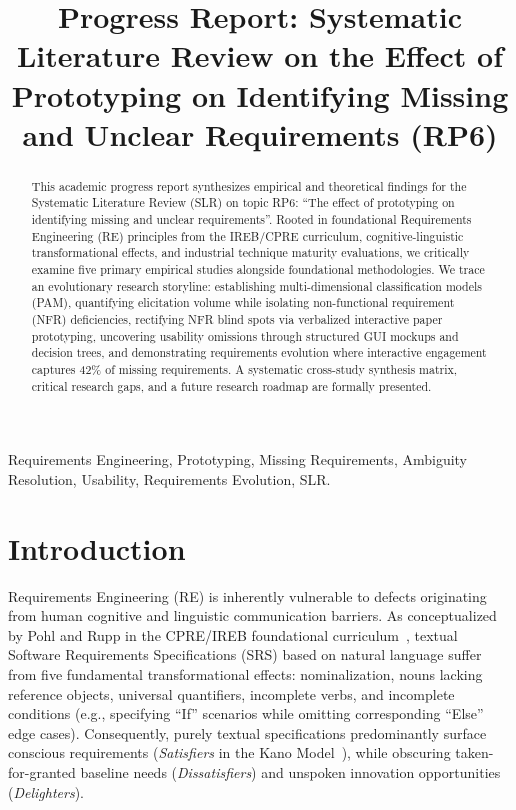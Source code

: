 \documentclass[conference]{IEEEtran}
\begin{document}
\title{Progress Report: Systematic Literature Review on the Effect of Prototyping on Identifying Missing and Unclear Requirements (RP6)}

\author{
}

\maketitle

\begin{abstract}
This academic progress report synthesizes empirical and theoretical findings for the Systematic Literature Review (SLR) on topic RP6: ``The effect of prototyping on identifying missing and unclear requirements''. Rooted in foundational Requirements Engineering (RE) principles from the IREB/CPRE curriculum, cognitive-linguistic transformational effects, and industrial technique maturity evaluations, we critically examine five primary empirical studies alongside foundational methodologies. We trace an evolutionary research storyline: establishing multi-dimensional classification models (PAM), quantifying elicitation volume while isolating non-functional requirement (NFR) deficiencies, rectifying NFR blind spots via verbalized interactive paper prototyping, uncovering usability omissions through structured GUI mockups and decision trees, and demonstrating requirements evolution where interactive engagement captures 42\% of missing requirements. A systematic cross-study synthesis matrix, critical research gaps, and a future research roadmap are formally presented.
\end{abstract}

\begin{IEEEkeywords}
Requirements Engineering, Prototyping, Missing Requirements, Ambiguity Resolution, Usability, Requirements Evolution, SLR.
\end{IEEEkeywords}

\section{Introduction}
Requirements Engineering (RE) is inherently vulnerable to defects originating from human cognitive and linguistic communication barriers. As conceptualized by Pohl and Rupp in the CPRE/IREB foundational curriculum~\cite{bbau_re_book, PohlRupp2015}, textual Software Requirements Specifications (SRS) based on natural language suffer from five fundamental transformational effects: nominalization, nouns lacking reference objects, universal quantifiers, incomplete verbs, and incomplete conditions (e.g., specifying ``If'' scenarios while omitting corresponding ``Else'' edge cases). Consequently, purely textual specifications predominantly surface conscious requirements (\textit{Satisfiers} in the Kano Model~\cite{bbau_re_book}), while obscuring taken-for-granted baseline needs (\textit{Dissatisfiers}) and unspoken innovation opportunities (\textit{Delighters}).
\end{document}
